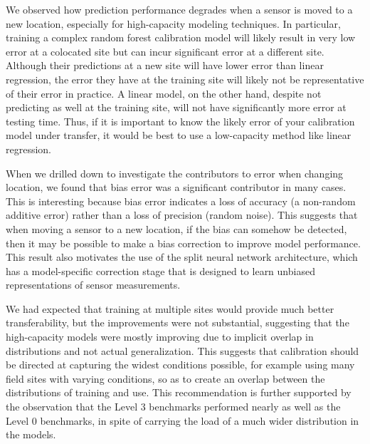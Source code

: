 \documentclass[journal abbreviation, manuscript]{copernicus}
\newcommand{\textus}[1]{$_{\text{#1}}$}
\begin{document}
We observed how prediction performance degrades when a sensor is moved to a new location, especially for high-capacity modeling techniques. In particular, training a complex random forest calibration model will likely result in very low error at a colocated site but can incur significant error at a different site. Although their predictions at a new site will have lower error than linear regression, the error they have at the training site will likely not be representative of their error in practice.  A linear model, on the other hand, despite not predicting as well at the training site, will not have significantly more error at testing time.  Thus, if it is important to know the likely error of your calibration model under transfer, it would be best to use a low-capacity method like linear regression.

When we drilled down to investigate the contributors to error when changing location, we found that bias error was a significant contributor in many cases. This is interesting because bias error indicates a loss of accuracy (a non-random additive error) rather than a loss of precision (random noise). This suggests that when moving a sensor to a new location, if the bias can somehow be detected, then it may be possible to make a bias correction to improve model performance. This result also motivates the use of the split neural network architecture, which has a model-specific correction stage that is designed to learn unbiased representations of sensor measurements.

We had expected that training at multiple sites would provide much better transferability, but the improvements were not substantial, suggesting that the high-capacity models were mostly improving due to implicit overlap in distributions and not actual generalization.  This suggests that calibration should be directed at capturing the widest conditions possible, for example using many field sites with varying conditions, so as to create an overlap between the distributions of training and use.  This recommendation is further supported by the observation that the Level 3 benchmarks performed nearly as well as the Level 0 benchmarks, in spite of carrying the load of a much wider distribution in the models.
\end{document}
